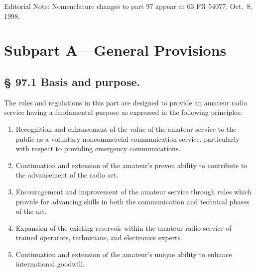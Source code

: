 \documentclass[
  letterpaper,
  DIV=11,
  numbers=noendperiod]{scrreport}
\begin{document}
\begin{tcolorbox}[enhanced jigsaw, colframe=quarto-callout-note-color-frame, opacitybacktitle=0.6, colback=white, arc=.35mm, toprule=.15mm, bottomtitle=1mm, breakable, titlerule=0mm, toptitle=1mm, title=\textcolor{quarto-callout-note-color}{\faInfo}\hspace{0.5em}{Note}, rightrule=.15mm, coltitle=black, left=2mm, colbacktitle=quarto-callout-note-color!10!white, opacityback=0, bottomrule=.15mm, leftrule=.75mm]

Editorial Note: Nomenclature changes to part 97 appear at 63 FR 54077,
Oct.~8, 1998.

\end{tcolorbox}

\hypertarget{subpart-A}{%
\section*{Subpart A---General Provisions}\label{subpart-A}}


\hypertarget{97.1}{%
\subsection*{§ 97.1 Basis and purpose.}\label{97.1}}

The rules and regulations in this part are designed to provide an
amateur radio service having a fundamental purpose as expressed in the
following principles:

\begin{enumerate}
\def\labelenumi{(\alph{enumi})}
\item
  Recognition and enhancement of the value of the amateur service to the
  public as a voluntary noncommercial communication service,
  particularly with respect to providing emergency communications.
\item
  Continuation and extension of the amateur's proven ability to
  contribute to the advancement of the radio art.
\item
  Encouragement and improvement of the amateur service through rules
  which provide for advancing skills in both the communication and
  technical phases of the art.
\item
  Expansion of the existing reservoir within the amateur radio service
  of trained operators, technicians, and electronics experts.
\item
  Continuation and extension of the amateur's unique ability to enhance
  international goodwill.
\end{enumerate}
\end{document}
